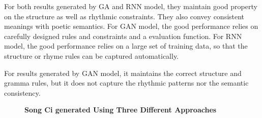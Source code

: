 For both results generated by GA and RNN model, they maintain good property on the structure as well as rhythmic constraints. %
They also convey consistent meanings with poetic semantics. For GAN model, the good performance relies on carefully designed rules and constraints and a evaluation function. 
%
For RNN model, the good performance relies on a large set of training data, so that the structure or rhyme rules can be captured automatically.

For results generated by GAN model, it maintains the correct structure and gramma rules, but it does not capture the rhythmic patterns nor the semantic consistency.

 \begin{figure}[ht]
 \hspace{-0.2in}
\begin{minipage}[t]{1.1\linewidth}
\centering 
{}
  \hspace{-0.2in}
  \hspace{-0.2in}
\caption{\textbf{Song Ci generated Using Three Different Approaches}}
\label{fig:songci}
\end{minipage}
\end{figure}


 